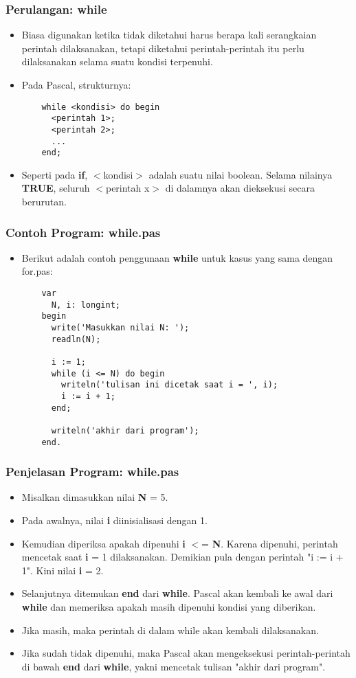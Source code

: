 \begin{frame}[fragile]
\frametitle{Perulangan: while}
\begin{itemize}
  \item Biasa digunakan ketika tidak diketahui harus berapa kali serangkaian perintah dilaksanakan, tetapi diketahui perintah-perintah itu perlu dilaksanakan selama suatu kondisi terpenuhi.
  \item Pada Pascal, strukturnya:
  \begin{lstlisting}
    while <kondisi> do begin
      <perintah 1>;
      <perintah 2>;
      ...
    end;
  \end{lstlisting}
  \item Seperti pada \textbf{if}, $<$kondisi$>$ adalah suatu nilai boolean. Selama nilainya \textbf{TRUE}, seluruh $<$perintah x$>$ di dalamnya akan dieksekusi secara berurutan.
\end{itemize}
\end{frame}

\begin{frame}[fragile]
\frametitle{Contoh Program: while.pas}
\begin{itemize}
  \item Berikut adalah contoh penggunaan \textbf{while} untuk kasus yang sama dengan for.pas:
  \begin{lstlisting}
    var
      N, i: longint;
    begin
      write('Masukkan nilai N: ');
      readln(N);

      i := 1;
      while (i <= N) do begin
        writeln('tulisan ini dicetak saat i = ', i);
        i := i + 1;
      end;

      writeln('akhir dari program');
    end.
  \end{lstlisting}
\end{itemize}
\end{frame}

\begin{frame}
\frametitle{Penjelasan Program: while.pas}
\begin{itemize}
  \item Misalkan dimasukkan nilai \textbf{N} = 5.
  \item Pada awalnya, nilai \textbf{i} diinisialisasi dengan 1.
  \item Kemudian diperiksa apakah dipenuhi \textbf{i} $<$= \textbf{N}. Karena dipenuhi, perintah mencetak saat \textbf{i} = 1 dilaksanakan. Demikian pula dengan perintah "i := i + 1". Kini nilai \textbf{i} = 2.
  \item Selanjutnya ditemukan \textbf{end} dari \textbf{while}. Pascal akan kembali ke awal dari \textbf{while} dan memeriksa apakah masih dipenuhi kondisi yang diberikan.
  \item Jika masih, maka perintah di dalam while akan kembali dilaksanakan.
  \item Jika sudah tidak dipenuhi, maka Pascal akan mengeksekusi perintah-perintah di bawah \textbf{end} dari \textbf{while}, yakni mencetak tulisan "akhir dari program".
\end{itemize}
\end{frame}

